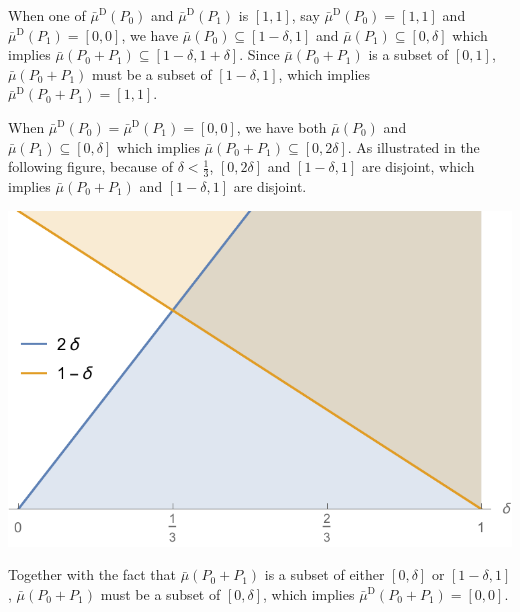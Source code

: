 \documentclass[english,reprint, aps, prl,superscriptaddress, showpacs,
showkeys, longbibliography, amsmath, amssymb, floatfix]{revtex4-1}
\theoremstyle{plain}
\theoremstyle{definition}
\newcommand{\imposs}{\ensuremath{\left[0,0\right]}}
\newcommand{\necess}{\ensuremath{\left[1,1\right]}}
\begin{document}
When one of $\bar{\mu}^{\textrm{D}}\left(P_{0}\right)$ and $\bar{\mu}^{\textrm{D}}\left(P_{1}\right)$
is $\necess$, say $\bar{\mu}^{\textrm{D}}\left(P_{0}\right)=\necess$
and $\bar{\mu}^{\textrm{D}}\left(P_{1}\right)=\imposs$, we have $\bar{\mu}\left(P_{0}\right)\subseteq\left[1-\delta,1\right]$
and $\bar{\mu}\left(P_{1}\right)\subseteq\left[0,\delta\right]$ which
implies $\bar{\mu}\left(P_{0}+P_{1}\right)\subseteq\left[1-\delta,1+\delta\right]$.
Since $\bar{\mu}\left(P_{0}+P_{1}\right)$ is a subset of $\left[0,1\right]$,
$\bar{\mu}\left(P_{0}+P_{1}\right)$ must be a subset of $\left[1-\delta,1\right]$,
which implies $\bar{\mu}^{\textrm{D}}\left(P_{0}+P_{1}\right)=\necess$.

When $\bar{\mu}^{\textrm{D}}\left(P_{0}\right)=\bar{\mu}^{\textrm{D}}\left(P_{1}\right)=\imposs$,
we have both $\bar{\mu}\left(P_{0}\right)$ and $\bar{\mu}\left(P_{1}\right)\subseteq\left[0,\delta\right]$
which implies $\bar{\mu}\left(P_{0}+P_{1}\right)\subseteq\left[0,2\delta\right]$.
As illustrated in the following figure, because of $\delta<\frac{1}{3}$,
$\left[0,2\delta\right]$ and $\left[1-\delta,1\right]$ are disjoint,
which implies $\bar{\mu}\left(P_{0}+P_{1}\right)$ and $\left[1-\delta,1\right]$
are disjoint.
\begin{center}
\includegraphics[scale=0.5]{prop_prop_letter_ajhs_referee_response_nb}
\par\end{center}

\noindent Together with the fact that $\bar{\mu}\left(P_{0}+P_{1}\right)$
is a subset of either $\left[0,\delta\right]$ or $\left[1-\delta,1\right]$,
$\bar{\mu}\left(P_{0}+P_{1}\right)$ must be a subset of $\left[0,\delta\right]$,
which implies $\bar{\mu}^{\textrm{D}}\left(P_{0}+P_{1}\right)=\imposs$.
\end{document}
